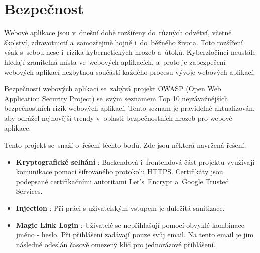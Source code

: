\chapter{Bezpečnost}
Webové aplikace jsou v~dnešní době rozšířeny do~různých odvětví, včetně školství, zdravotnictí a~samozřejmě hojně i~do~běžného života. Toto rozšíření však s~sebou nese i~rizika kybernetických hrozeb a~útoků. Kyberzločinci neustále hledají zranitelná místa ve~webových aplikacích, a~proto je zabezpečení webových aplikací nezbytnou součástí každého procesu vývoje webových aplikací. \par
Bezpečností webových aplikací se~zabývá projekt OWASP \cite{owasp}(Open Web Application Security Project) se~svým seznamem Top 10 nejzávažnějších \cite{owasp10} bezpečnostních rizik webových aplikací. Tento seznam je pravidelně aktualizován, aby odrážel nejnovější trendy v~oblasti bezpečnostních hrozeb pro webové aplikace.\par
Tento projekt se~snaží o~řešení těchto bodů. Zde jsou některá navržená řešení.\par

\begin{itemize}
    \item \textbf{Kryptografické selhání} \cite{crypto}: Backendová i~frontendová část projektu využívají komunikace pomocí šifrovaného protokolu HTTPS. Certifikáty jsou podepsané certifikačními autoritami Let's~Encrypt a~Google Trusted Services.
    \item \textbf{Injection} \cite{nosqlinjection}: Při práci s uživatelským vstupem je důležitá sanitizace.
    \item \textbf{Magic Link Login} \cite{magiclinklogin}: Uživatelé se nepřihlašují pomocí obvyklé kombinace jméno - heslo. Při přihlášení zadávají pouze svůj email. Na tento email je jim následně odeslán časově omezený klíč pro jednorázové přihlášení.
\end{itemize}
